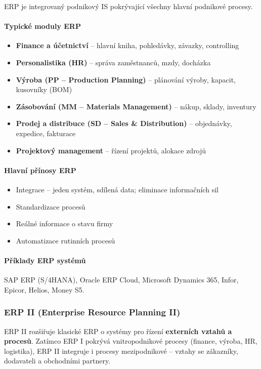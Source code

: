 ERP je integrovaný podnikový IS pokrývající všechny hlavní podnikové procesy.

\paragraph{Typické moduly ERP}
\begin{itemize}
  \item \textbf{Finance a účetnictví} -- hlavní kniha, pohledávky, závazky, controlling
  \item \textbf{Personalistika (HR)} -- správa zaměstnanců, mzdy, docházka
  \item \textbf{Výroba (PP -- Production Planning)} -- plánování výroby, kapacit, kusovníky (BOM)
  \item \textbf{Zásobování (MM -- Materials Management)} -- nákup, sklady, inventury
  \item \textbf{Prodej a distribuce (SD -- Sales \& Distribution)} -- objednávky, expedice, fakturace
  \item \textbf{Projektový management} -- řízení projektů, alokace zdrojů
\end{itemize}

\paragraph{Hlavní přínosy ERP}
\begin{itemize}
  \item Integrace -- jeden systém, sdílená data; eliminace informačních sil
  \item Standardizace procesů
  \item Reálné informace o stavu firmy
  \item Automatizace rutinních procesů
\end{itemize}

\paragraph{Příklady ERP systémů}
SAP ERP (S/4HANA), Oracle ERP Cloud, Microsoft Dynamics 365, Infor, Epicor, Helios, Money S5.

\subsubsection{ERP II (Enterprise Resource Planning II)}

ERP II rozšiřuje klasické ERP o systémy pro řízení \textbf{externích vztahů a procesů}.
Zatímco ERP I pokrývá vnitropodnikové procesy (finance, výroba, HR, logistika), ERP II integruje
i procesy mezipodnikové -- vztahy se zákazníky, dodavateli a obchodními partnery.

